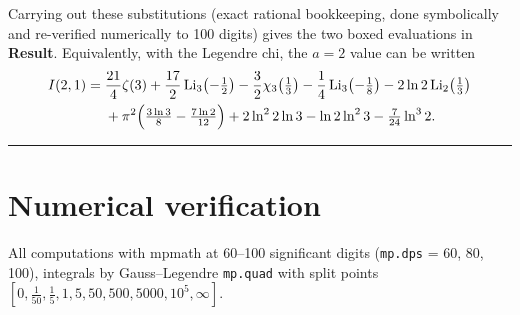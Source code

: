 \documentclass[11pt]{article}
\theoremstyle{remark}
\begin{document}
Carrying out these substitutions (exact rational bookkeeping, done symbolically and re-verified numerically to 100 digits) gives the two boxed evaluations in \textbf{Result}. Equivalently, with the Legendre chi, the $a=2$ value can be written
\[\begin{aligned}
I(2,1)=\;&\frac{21}{4}\zeta(3)+\frac{17}{2}\operatorname{Li}_3\!\left(-\tfrac12\right)-\frac32\chi_3\!\left(\tfrac13\right)-\frac14\operatorname{Li}_3\!\left(-\tfrac18\right)-2\ln2\operatorname{Li}_2\!\left(\tfrac13\right)\\
&+\pi^2\Bigl(\tfrac{3\ln3}{8}-\tfrac{7\ln2}{12}\Bigr)+2\ln^22\ln3-\ln2\ln^23-\tfrac{7}{24}\ln^32 .
\end{aligned}\]

\begin{center}\rule{0.4\textwidth}{0.4pt}\end{center}

\section*{Numerical verification}

All computations with mpmath at 60--100 significant digits (\texttt{mp.dps} = 60, 80, 100), integrals by Gauss--Legendre \texttt{mp.quad} with split points $[0,\frac1{50},\frac15,1,5,50,500,5000,10^5,\infty]$.
\end{document}
